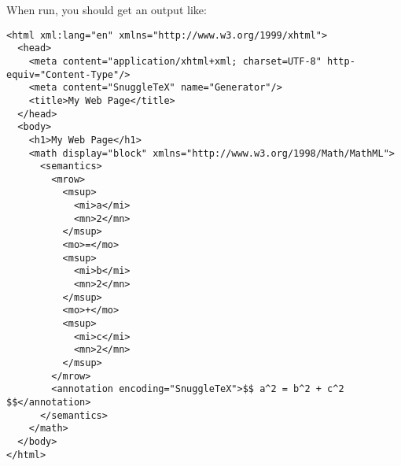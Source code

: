 When run, you should get an output like:

\begin{verbatim}
<html xml:lang="en" xmlns="http://www.w3.org/1999/xhtml">
  <head>
    <meta content="application/xhtml+xml; charset=UTF-8" http-equiv="Content-Type"/>
    <meta content="SnuggleTeX" name="Generator"/>
    <title>My Web Page</title>
  </head>
  <body>
    <h1>My Web Page</h1>
    <math display="block" xmlns="http://www.w3.org/1998/Math/MathML">
      <semantics>
        <mrow>
          <msup>
            <mi>a</mi>
            <mn>2</mn>
          </msup>
          <mo>=</mo>
          <msup>
            <mi>b</mi>
            <mn>2</mn>
          </msup>
          <mo>+</mo>
          <msup>
            <mi>c</mi>
            <mn>2</mn>
          </msup>
        </mrow>
        <annotation encoding="SnuggleTeX">$$ a^2 = b^2 + c^2 $$</annotation>
      </semantics>
    </math>
  </body>
</html>
\end{verbatim}
